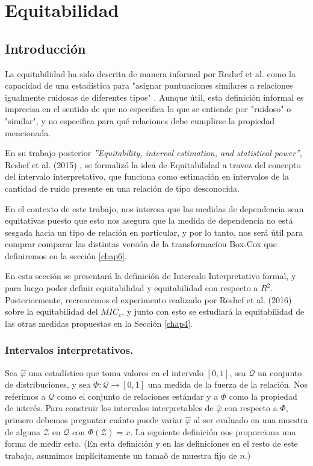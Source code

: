 \chapter{Equitabilidad}\label{appA}

	\section{Introducci\'on}

	La equitabilidad ha sido descrita de manera informal por Reshef et al. como la capacidad de una estad\'istica para "asignar puntuaciones similares a relaciones igualmente ruidosas de diferentes tipos" \cite{Reshef2011}. Aunque \'util, esta definici\'on informal es imprecisa en el sentido de que no especifica lo que se entiende por "ruidoso" o "similar", y no especifica para qu\'e relaciones debe cumplirse la propiedad mencionada.

	En su trabajo posterior \textit{''Equitability, interval estimation, and statistical power''}, Reshef et al. (2015) \cite{Reshef2015}, se formaliz\'o la idea de Equitabilidad a travez del concepto del intervalo interpretativo, que funciona como estimaci\'on en intervalos de la cantidad de ruido presente en una relaci\'on de tipo desconocida. 

	En el contexto de este trabajo, nos interesa que las medidas de dependencia sean equitativas puesto que esto nos asegura que la medida de dependencia no est\'a sesgada hacia un tipo de relaci\'on en particular, y por lo tanto, nos ser\'a \'util para comprar comparar las distintas versi\'on de la transformac\'ion Box-Cox que definiremos en la secci\'on \ref{chap6}.

	En esta secci\'on se presentar\'a la definici\'on de Intercalo Interpretativo formal, y para luego poder definir equitabilidad y  equitabilidad con respecto a $R^2$. Posteriormente, recrearemos el experimento realizado por Reshef et al. (2016) \cite{Reshef2016} sobre la equitabilidad del $MIC_e$, y junto con esto se estudiar\'a la equitabilidad de las otras medidas propuestas en la Secci\'on \ref{chap4}. 

	\subsection[equidefiniciones]{Intervalos interpretativos.}

	Sea $\hat{\varphi}$ una estad\'istico que toma valores en el intervalo $[0,1]$, sea $\mathcal{Q}$ un conjunto de distribuciones, y sea $\Phi: \mathcal{Q} \rightarrow [0,1]$ una medida de la fuerza de la relaci\'on. Nos referimos a $\mathcal{Q}$ como el conjunto de relaciones est\'andar y a $\Phi$ como la propiedad de inter\'es. Para construir los intervalos interpretables de $\hat{\varphi}$ con respecto a $\Phi$, primero debemos preguntar cu\'anto puede variar $\hat{\varphi}$ al ser evaluado en una muestra de alguna $\mathcal{Z}$ en $\mathcal{Q}$ con $\Phi(\mathcal{Z})=x$. La siguiente definici\'on nos proporciona una forma de medir esto. (En esta definici\'on y en las definiciones en el resto de este trabajo, asumimos impl\'icitamente un tama\~o de muestra fijo de $n$.)


